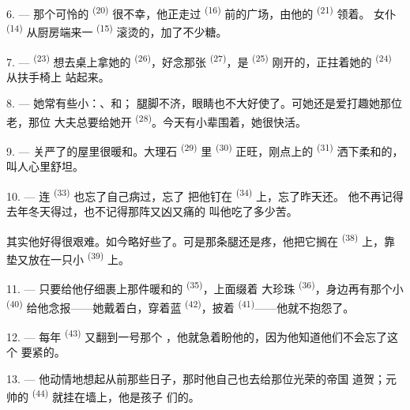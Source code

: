 \VUsaut{4.2mm}
\VUsaut{3.0mm}

6. --- 那个可怜的 \textsuperscript{(20)} 很不幸，他正走过
\textsuperscript{(16)} 前的广场，由他的 \textsuperscript{(21)} 领着。
女仆 \textsuperscript{(14)} 从厨房端来一
\textsuperscript{(15)} 滚烫的，加了不少糖。

7. ---  \textsuperscript{(23)} 想去桌上拿她的
\textsuperscript{(26)}，好念那张 \textsuperscript{(27)}，是 \textsuperscript{(25)}
刚开的，正拄着她的 \textsuperscript{(24)} 从扶手椅上
站起来。

8. --- 她常有些小：、和；
腿脚不济，眼睛也不大好使了。可她还是爱打趣她那位老，那位
大夫总要给她开 \textsuperscript{(28)}。今天有小辈围着，她很快活。

9. --- 关严了的屋里很暖和。大理石 \textsuperscript{(29)} 里
 \textsuperscript{(30)} 正旺，刚点上的
\textsuperscript{(31)} 洒下柔和的，叫人心里舒坦。

\VUsaut{4.2mm}
\VUsaut{3.0mm}

10. --- 连 \textsuperscript{(33)} 也忘了自己病过，忘了
把他钉在 \textsuperscript{(34)} 上，忘了昨天还。
他不再记得去年冬天得过，也不记得那阵又凶又痛的
叫他吃了多少苦。

其实他好得很艰难。如今略好些了。可是那条腿还是疼，他把它搁在
\textsuperscript{(38)} 上，靠垫又放在一只小 \textsuperscript{(39)} 上。

11. --- 只要给他仔细裹上那件暖和的 \textsuperscript{(35)}，上面缀着
大珍珠 \textsuperscript{(36)}，身边再有那个小
\textsuperscript{(40)} 给他念报——她戴着白，穿着蓝
\textsuperscript{(42)}，披着 \textsuperscript{(41)}——他就不抱怨了。

12. --- 每年 \textsuperscript{(43)} 又翻到一号那个
，他就急着盼他的，因为他知道他们不会忘了这个
要紧的。

13. --- 他动情地想起从前那些日子，那时他自己也去给那位光荣的帝国
道贺；元帅的 \textsuperscript{(44)} 就挂在墙上，他是孩子
们的。
\VUsaut{6.0mm}
\VUfilet{22mm}

